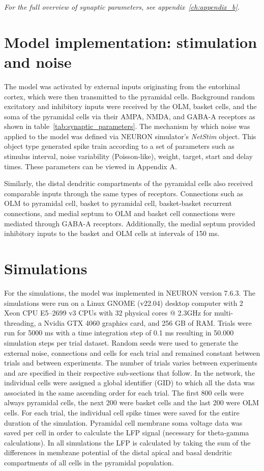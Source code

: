 \noindent
\textit{For the full overview of synaptic parameters, see appendix~\ref{ch:appendix_b}.}\pagebreak

\section{Model implementation: stimulation and noise}
The model was activated by external inputs originating from the entorhinal
cortex, which were then transmitted to the pyramidal cells. Background random
excitatory and inhibitory inputs were received by the OLM, basket cells, and
the soma of the pyramidal cells via their AMPA, NMDA, and GABA-A receptors as
shown in table~\ref{tab:synaptic_parameters}. The mechanism by which noise was
applied to the model was defined via NEURON simulator's \textit{NetStim}
object. This object type generated spike train according to a set of parameters
such as stimulus interval, noise variability (Poisson-like), weight, target,
start and delay times. These parameters can be viewed in Appendix A.

Similarly, the distal dendritic compartments of the pyramidal cells also
received comparable inputs through the same types of receptors. Connections
such as OLM to pyramidal cell, basket to pyramidal cell, basket-basket
recurrent connections, and medial septum to OLM and basket cell connections
were mediated through GABA-A receptors. Additionally, the medial septum
provided inhibitory inputs to the basket and OLM cells at intervals of 150 ms.

\section{Simulations}
For the simulations, the model was implemented in NEURON version 7.6.3. The
simulations were run on a Linux GNOME (v22.04) desktop computer with 2 Xeon CPU
E5--2699 v3 CPUs with 32 physical cores @ 2.3GHz for multi-threading, a Nvidia
GTX 4060 graphics card, and 256 GB of RAM\@. Trials were run for 5000 ms with a
time integration step of 0.1 ms resulting in 50.000 simulation steps per trial
dataset. Random seeds were used to generate the external noise, connections and
cells for each trial and remained constant between trials and between
experiments. The number of trials varies between experiments and are specified
in their respective sub-sections that follow. In the network, the individual
cells were assigned a global identifier (GID) to which all the data was
associated in the same ascending order for each trial. The first 800 cells were
always pyramidal cells, the next 200 were basket cells and the last 200 were
OLM cells. For each trial, the individual cell spike times were saved for the
entire duration of the simulation. Pyramidal cell membrane soma voltage data
was saved per cell in order to calculate the LFP signal (necessary for
theta-gamma calculations). In all simulations the LFP is calculated by
taking the sum of the differences in membrane potential of the distal apical
and basal dendritic compartments of all cells in the pyramidal population.

